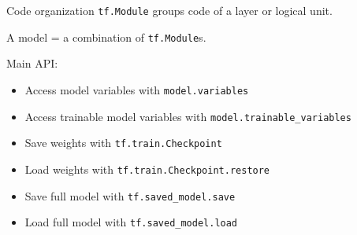 \begin{frame}{Code organization}
  \texttt{tf.Module} groups code of a layer or logical unit.

  A model = a combination of \texttt{tf.Module}s.

  Main API:

  \begin{itemize}[<+->]
    \item Access model variables with \texttt{model.variables}
    \item Access trainable model variables with \texttt{model.trainable\_variables}
    \item Save weights with \texttt{tf.train.Checkpoint}
    \item Load weights with \texttt{tf.train.Checkpoint.restore}
    \item Save full model with \texttt{tf.saved\_model.save}
    \item Load full model with \texttt{tf.saved\_model.load}
  \end{itemize}
\end{frame}